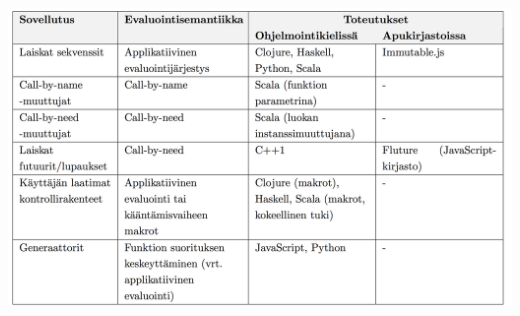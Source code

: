 \begin{table}[h]
\footnotesize
{}
\begin{center}
    \includegraphics[width=1.0\textwidth]{applications-table}
\end{center}
	\caption{\footnotesize \textbf{Sovellutukset koottuna.} Toteutus ohjelmointikielessä tarkoittaa, että kieli tukee sovellutusta joko syntaksinsa tai standardikirjastonsa kautta. Toteutus apukirjastossa tarkoittaa, että sovellutusta emuloidaan ohjelmointikielen tarjoamilla välineillä.}
    \label{table:sovellutukset}
\normalsize
\end{table}

